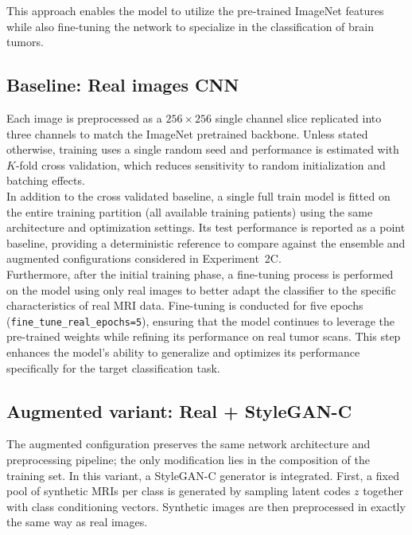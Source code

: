 This approach enables the model to utilize the pre-trained ImageNet features while also fine-tuning the network to specialize in the classification of brain tumors.




\subsection{Baseline: Real images CNN}
Each image is preprocessed as a $256\times256$ single channel slice replicated into three channels to match the ImageNet pretrained backbone. Unless stated otherwise, training uses a single random seed and performance is estimated with $K$-fold cross validation, which reduces sensitivity to random initialization and batching effects.\\

In addition to the cross validated baseline, a single full train model is fitted on the entire training partition (all available training patients) using the same architecture and optimization settings. Its test performance is reported as a point baseline, providing a deterministic reference to compare against the ensemble and augmented configurations considered in Experiment~2C.\\

Furthermore, after the initial training phase, a fine-tuning process is performed on the model using only real images to better adapt the classifier to the specific characteristics of real MRI data. Fine-tuning is conducted for five epochs (\texttt{fine\_tune\_real\_epochs=5}), ensuring that the model continues to leverage the pre-trained weights while refining its performance on real tumor scans. This step enhances the model’s ability to generalize and optimizes its performance specifically for the target classification task.



\subsection{Augmented variant: Real + StyleGAN-C}

The augmented configuration preserves the same network architecture and preprocessing pipeline; the only modification lies in the composition of the training set. In this variant, a StyleGAN-C generator is integrated. First, a fixed pool of synthetic MRIs per class is generated by sampling latent codes $z$ together with class conditioning vectors. Synthetic images are then preprocessed in exactly the same way as real images.\\

